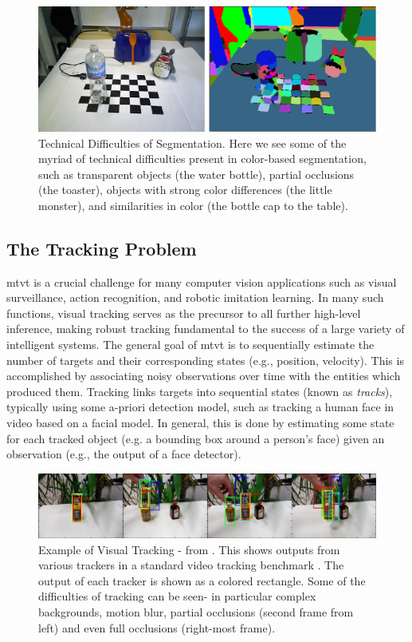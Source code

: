 \begin{figure}
\label{fig:SegmentationProblems}
\centering
\includegraphics[width=\linewidth]{figures/Introduction/Segmentation_Problems.pdf}
\caption[Technical Difficulties of Segmentation]{Technical Difficulties of Segmentation. Here we see some of the myriad of technical difficulties present in color-based segmentation, such as transparent objects (the water bottle), partial occlusions (the toaster), objects with strong color differences (the little monster), and similarities in color (the bottle cap to the table).}
\end{figure}


\subsection{The Tracking Problem}
\gls{mtvt} is a crucial challenge for many computer vision applications such as visual surveillance, action recognition, and robotic imitation learning. In many such functions, visual tracking serves as the precursor to all further high-level inference, making robust tracking fundamental to the success of a large variety of intelligent systems. The general goal of \gls{mtvt} is to sequentially estimate the number of targets and their corresponding states (e.g., position, velocity). This is accomplished by associating noisy observations over time with the entities which produced them. Tracking links targets into sequential states (known as \emph{tracks}), typically using some a-priori detection model, such as tracking a human face in video based on a facial model. In general, this is done by estimating some state for each tracked object (e.g. a bounding box around a person's face) given an observation (e.g., the output of a face detector).

\begin{figure}
\label{fig:ExampleTracking}
\centering
\includegraphics[width=\linewidth]{figures/Introduction/Tracking_Example.pdf}
\caption[Example of Visual Tracking]{Example of Visual Tracking - from \cite{PartFilter_Papon_2012}. This shows outputs from various trackers in a standard video tracking benchmark \cite{PROST}. The output of each tracker is shown as a colored rectangle. Some of the difficulties of tracking can be seen- in particular complex backgrounds, motion blur, partial occlusions (second frame from left) and even full occlusions (right-most frame).}
\end{figure}


